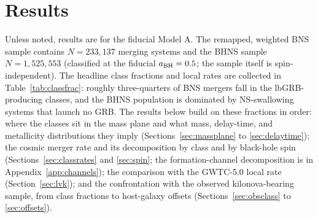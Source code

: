 \documentclass[twocolumn,amsmath]{aastex702}
\newcommand{\aBH}{a_{\rm BH}}
\begin{document}
\FloatBarrier
\section{Results} \label{sec:results}

Unless noted, results are for the fiducial Model A. The remapped, weighted BNS
sample contains $N = 233{,}137$ merging systems and the BHNS sample
$N = 1{,}525{,}553$ (classified at the fiducial $\aBH = 0.5$; the sample itself
is spin-independent). The headline class fractions and local
rates are collected in Table~\ref{tab:classfrac}: roughly three-quarters of BNS
mergers fall in the lbGRB-producing classes, and the BHNS population is dominated
by NS-swallowing systems that launch no GRB. The results below build on
these fractions in order: where the classes sit in the mass plane and what mass,
delay-time, and metallicity distributions they imply
(Sections~\ref{sec:massplane} to \ref{sec:delaytime}); the cosmic merger rate
and its decomposition by class and by black-hole spin
(Sections~\ref{sec:classrates} and \ref{sec:spin}; the formation-channel
decomposition is in Appendix~\ref{app:channels}); the comparison with
the GWTC-5.0 local rate (Section~\ref{sec:lvk}); and the confrontation with the
observed kilonova-bearing sample, from class fractions to host-galaxy offsets
(Sections~\ref{sec:obsclass} to \ref{sec:offsets}).
\end{document}
